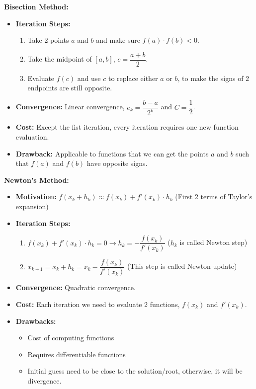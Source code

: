 \documentclass[12pt]{article}
\begin{document}
\medskip
\noindent \textbf{Bisection Method: }
\begin{itemize}

\item \textbf{Iteration Steps:}
    \begin{enumerate}
        \item Take 2 points $a$ and $b$ and make sure $f(a) \cdot f(b) < 0$.
        \item Take the midpoint of $[a, b]$, $c = \dfrac{a+b}{2}$.
        \item Evaluate $f(c)$ and use $c$ to replace either $a$ or $b$, to make the signs of 2 endpoints are still opposite.
    \end{enumerate}
\item \textbf{Convergence:} Linear convergence, $e_k = \dfrac{b-a}{2^k}$ and $C = \dfrac{1}{2}$.
\item \textbf{Cost: }Except the fist iteration, every iteration requires one new function evaluation.
\item \textbf{Drawback:} Applicable to functions that we can get the points $a$ and $b$ such that $f(a)$ and $f(b)$ have opposite signs.
\end{itemize}

\newpage
\noindent \textbf{Newton's Method:}
\begin{itemize}
    \item \textbf{Motivation:} $f(x_k+h_k) \approx f(x_k) + f'(x_k) \cdot h_k$ (First 2 terms of Taylor's expansion)
    \item \textbf{Iteration Steps:}
        \begin{enumerate}
            \item $f(x_k) + f'(x_k)\cdot h_k = 0 \to h_k = -\dfrac{f(x_k)}{f'(x_k)}$ ($h_k$ is called Newton step)
            \item $x_{k+1} = x_k + h_k = x_k - \dfrac{f(x_k)}{f'(x_k)}$ (This step is called Newton update)
        \end{enumerate}
    \item \textbf{Convergence:} Quadratic convergence.
    \item \textbf{Cost:} Each iteration we need to evaluate 2 functions, $f(x_k)$ and $f'(x_k)$.
    \item \textbf{Drawbacks: }
        \begin{itemize}
            \item Cost of computing functions
            \item Requires differentiable functions
            \item Initial guess need to be close to the solution/root, otherwise, it will be divergence.
        \end{itemize}
\end{itemize}
\end{document}
